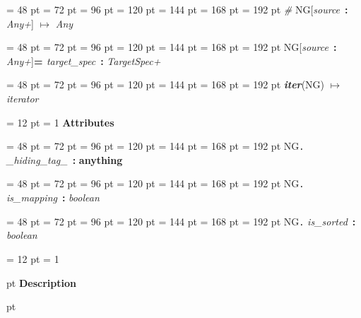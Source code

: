 {{{{\par \noindent  \leftskip = 48 pt  \leftmargini = 72 pt  \leftmarginii = 96 pt  \leftmarginiii = 120 pt  \leftmarginiv = 144 pt  \leftmarginv = 168 pt  \leftmarginvi = 192 pt  {\em {\#} \/}NG{[}{\em source\/}~{\bf :}  {\em Any+\/}] \(\mapsto \)  {\em Any\/}\par}
{\par \noindent  \leftskip = 48 pt  \leftmargini = 72 pt  \leftmarginii = 96 pt  \leftmarginiii = 120 pt  \leftmarginiv = 144 pt  \leftmarginv = 168 pt  \leftmarginvi = 192 pt NG{[}{\em source\/}~{\bf :}  {\em Any+\/}]{\bf {\large {\bf  = \/}}\/}{\em target{\_}spec\/}~{\bf :}  {\em TargetSpec+\/}\par}
{\par \noindent  \leftskip = 48 pt  \leftmargini = 72 pt  \leftmarginii = 96 pt  \leftmarginiii = 120 pt  \leftmarginiv = 144 pt  \leftmarginv = 168 pt  \leftmarginvi = 192 pt  {\em {\large {\bf iter\/}}\/}(NG) \(\mapsto \)  {\em iterator\/}\par}
{\par \pagebreak[3.200000] \noindent \hangindent = 12 pt \hangafter = 1 
{\bf {\large {\bf Attributes\/}}\/}\par}
{\par \noindent  \leftskip = 48 pt  \leftmargini = 72 pt  \leftmarginii = 96 pt  \leftmarginiii = 120 pt  \leftmarginiv = 144 pt  \leftmarginv = 168 pt  \leftmarginvi = 192 pt NG{\large {\tt .\/} {\em {\_}hiding{\_}tag{\_}\/}}~{\bf :} {\bf  anything\/}\par}
{\par \noindent  \leftskip = 48 pt  \leftmargini = 72 pt  \leftmarginii = 96 pt  \leftmarginiii = 120 pt  \leftmarginiv = 144 pt  \leftmarginv = 168 pt  \leftmarginvi = 192 pt NG{\large {\tt .\/} {\em is{\_}mapping\/}}~{\bf :}  {\em boolean\/}\par}
{\par \noindent  \leftskip = 48 pt  \leftmargini = 72 pt  \leftmarginii = 96 pt  \leftmarginiii = 120 pt  \leftmarginiv = 144 pt  \leftmarginv = 168 pt  \leftmarginvi = 192 pt NG{\large {\tt .\/} {\em is{\_}sorted\/}}~{\bf :}  {\em boolean\/}\par}
\par}
\par}
{\par \pagebreak[3.300000] \noindent \hangindent = 12 pt \hangafter = 1 
{\par \pagebreak[3]  pt \noindent
{\Large {\bf Description\/}}\par {} pt
}}}
